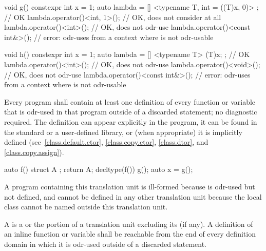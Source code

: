 \pnum
\begin{example}
\begin{codeblock}
void g() {
  constexpr int x = 1;
  auto lambda = [] <typename T, int = ((T)x, 0)> {};    // OK
  lambda.operator()<int, 1>();          // OK, does not consider  at all
  lambda.operator()<int>();             // OK, does not odr-use 
  lambda.operator()<const int&>();      // error: odr-uses  from a context where  is not odr-usable
}

void h() {
  constexpr int x = 1;
  auto lambda = [] <typename T> { (T)x; };      // OK
  lambda.operator()<int>();             // OK, does not odr-use 
  lambda.operator()<void>();            // OK, does not odr-use 
  lambda.operator()<const int&>();      // error: odr-uses  from a context where  is not odr-usable
}
\end{codeblock}
\end{example}

\pnum
Every program shall contain at least one definition of every
function or variable that is odr-used in that program
outside of a discarded statement; no diagnostic required.
The definition can appear explicitly in the program, it can be found in
the standard or a user-defined library, or (when appropriate) it is
implicitly defined (see~\ref{class.default.ctor}, \ref{class.copy.ctor},
\ref{class.dtor}, and \ref{class.copy.assign}).
\begin{example}
\begin{codeblock}
auto f() {
  struct A {};
  return A{};
}
decltype(f()) g();
auto x = g();
\end{codeblock}
A program containing this translation unit is ill-formed
because  is odr-used but not defined,
and cannot be defined in any other translation unit
because the local class  cannot be named outside this
translation unit.
\end{example}

\pnum
A  is
a  or
the portion of a translation unit
excluding its  (if any).
A definition of an inline function or variable shall be reachable
from the end of every definition domain
in which it is odr-used outside of a discarded statement.

